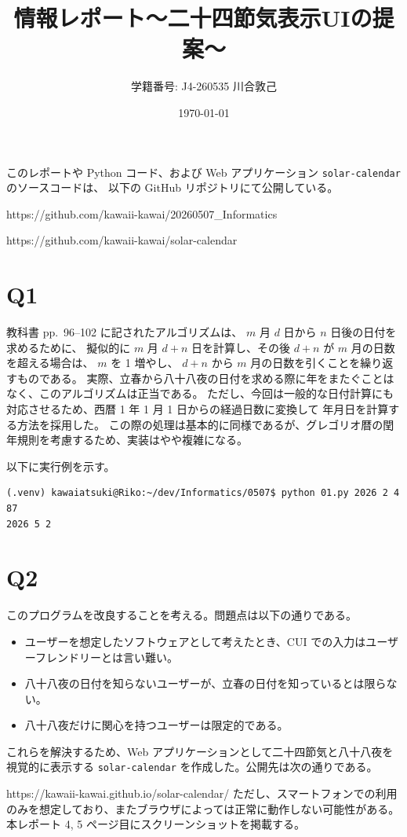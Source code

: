 \documentclass[a4paper]{jlreq}
\title{情報レポート～二十四節気表示UIの提案～}
\author{学籍番号: J4-260535 川合敦己}
\date{\today}
\begin{document}
\maketitle

このレポートや Python コード、および Web アプリケーション \texttt{solar-calendar} のソースコードは、
以下の GitHub リポジトリにて公開している。
\par
https://github.com/kawaii-kawai/20260507\_Informatics
\par
https://github.com/kawaii-kawai/solar-calendar

\section*{Q1}

教科書 pp.~96--102 に記されたアルゴリズムは、 $m$ 月 $d$ 日から $n$ 日後の日付を求めるために、
擬似的に $m$ 月 $d+n$ 日を計算し、その後 $d+n$ が $m$ 月の日数を超える場合は、
$m$ を 1 増やし、 $d+n$ から $m$ 月の日数を引くことを繰り返すものである。
実際、立春から八十八夜の日付を求める際に年をまたぐことはなく、このアルゴリズムは正当である。
ただし、今回は一般的な日付計算にも対応させるため、西暦 1 年 1 月 1 日からの経過日数に変換して
年月日を計算する方法を採用した。
この際の処理は基本的に同様であるが、グレゴリオ暦の閏年規則を考慮するため、実装はやや複雑になる。

以下に実行例を示す。

\begin{verbatim}
(.venv) kawaiatsuki@Riko:~/dev/Informatics/0507$ python 01.py 2026 2 4 87
2026 5 2
\end{verbatim}

\section*{Q2}

このプログラムを改良することを考える。問題点は以下の通りである。

\begin{itemize}
    \item ユーザーを想定したソフトウェアとして考えたとき、CUI での入力はユーザーフレンドリーとは言い難い。
    \item 八十八夜の日付を知らないユーザーが、立春の日付を知っているとは限らない。
    \item 八十八夜だけに関心を持つユーザーは限定的である。
\end{itemize}

これらを解決するため、Web アプリケーションとして二十四節気と八十八夜を視覚的に表示する
\texttt{solar-calendar} を作成した。公開先は次の通りである。
\par
https://kawaii-kawai.github.io/solar-calendar/
ただし、スマートフォンでの利用のみを想定しており、またブラウザによっては正常に動作しない可能性がある。本レポート 4, 5 ページ目にスクリーンショットを掲載する。
\end{document}
